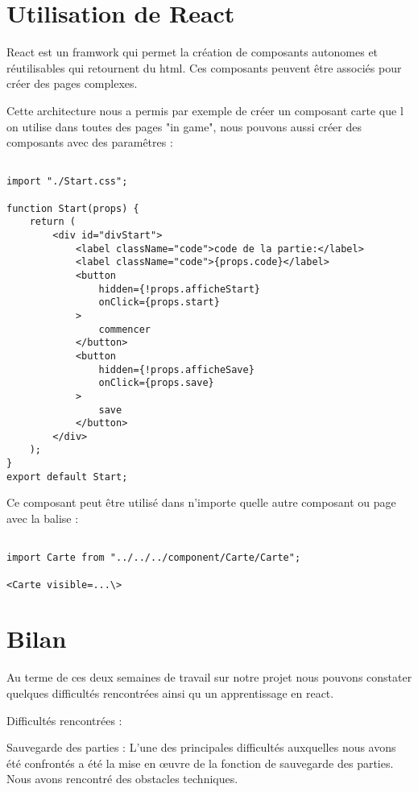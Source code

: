 \documentclass[a4paper]{article}
\begin{document}
\section{Utilisation de React}
React est un framwork qui permet la création de composants autonomes et réutilisables qui retournent du html. Ces composants peuvent être associés pour créer des pages complexes.

Cette architecture nous a permis par exemple de créer un composant carte que l on utilise dans toutes des pages "in game", nous pouvons aussi créer des composants avec des paramêtres :

\begin{lstlisting}

import "./Start.css";

function Start(props) {
    return (
        <div id="divStart">
            <label className="code">code de la partie:</label>
            <label className="code">{props.code}</label>
            <button
                hidden={!props.afficheStart}
                onClick={props.start}
            >
                commencer
            </button>
            <button
                hidden={!props.afficheSave}
                onClick={props.save}
            >
                save
            </button>
        </div>
    );
}
export default Start;

\end{lstlisting}

Ce composant peut être utilisé dans n'importe quelle autre composant ou page avec la balise :
\begin{lstlisting}

import Carte from "../../../component/Carte/Carte";

<Carte visible=...\>

\end{lstlisting}

\section{Bilan}
Au terme de ces deux semaines de travail sur notre projet nous pouvons constater quelques difficultés rencontrées ainsi qu un apprentissage en react.

Difficultés rencontrées :

Sauvegarde des parties : L'une des principales difficultés auxquelles nous avons été confrontés a été la mise en œuvre de la fonction de sauvegarde des parties. Nous avons rencontré des obstacles techniques.
\end{document}

